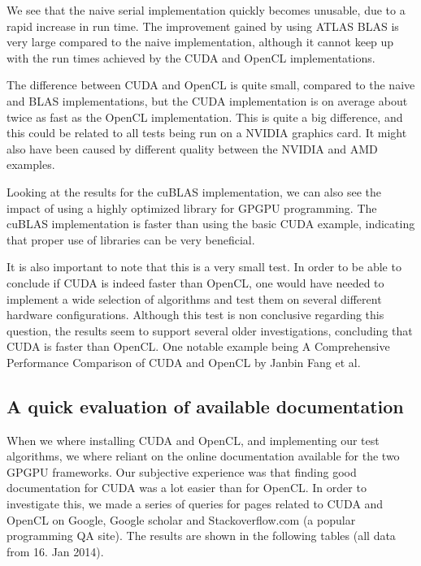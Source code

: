 We see that the naive serial implementation quickly becomes unusable, due to a rapid increase in run time. The improvement gained by using ATLAS BLAS is very large compared to the naive implementation, although it cannot keep up with the run times achieved by the CUDA and OpenCL implementations.

The difference between CUDA and OpenCL is quite small, compared to the naive and BLAS implementations, but the CUDA implementation is on average about twice as fast as the OpenCL implementation. This is quite a big difference, and this could be related to all tests being run on a NVIDIA graphics card. It might also have been caused by different quality between the NVIDIA and AMD examples.

Looking at the results for the cuBLAS implementation, we can also see the impact of using a highly optimized library for GPGPU programming. The cuBLAS implementation is faster than using the basic CUDA example, indicating that proper use of libraries can be very beneficial.

It is also important to note that this is a very small test. In order to be able to conclude if CUDA is indeed faster than OpenCL, one would have needed to implement a wide selection of algorithms and test them on several different hardware configurations. Although this test is non conclusive regarding this question, the results seem to support several older investigations, concluding that CUDA is faster than OpenCL. One notable example being A Comprehensive Performance Comparison of
CUDA and OpenCL\cite{Fang11} by Janbin Fang et al.

\subsection{A quick evaluation of available documentation} %
\label{sub:a_quick_evaluation_of_available_documentation}

When we where installing CUDA and OpenCL, and implementing our test algorithms, we where reliant on the online documentation available for the two GPGPU frameworks. Our subjective experience was that finding good documentation for CUDA was a lot easier than for OpenCL. In order to investigate this, we made a series of queries for pages related to CUDA and OpenCL on Google, Google scholar and Stackoverflow.com (a popular programming QA site). The results are shown in the following tables (all data from 16. Jan 2014).

